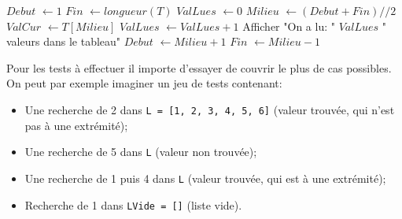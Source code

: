 \documentclass[12pt]{article}
\begin{document}
\begin{MaReponse}
\begin{alphenum}
			\begin{algorithmic}[1]
				\State $Debut$ $\leftarrow 1$
				\State $Fin$ $\leftarrow longueur(T)$
				\State $ValLues$ $\leftarrow 0$
				\State $Milieu$ $\leftarrow (Debut + Fin) // 2$
				\State $ValCur$ $\leftarrow T[Milieu]$
				\State $ValLues$ $\leftarrow ValLues + 1$
				\State Afficher "On a lu: " $ValLues$ " valeurs dans le tableau"
				\State{}
				\State $Debut$ $\leftarrow Milieu + 1$
				\Else
				\State $Fin$ $\leftarrow Milieu - 1$
				\EndIf
				\EndWhile
				\State{}
				\EndFunction
			\end{algorithmic}
			\item Pour les tests à effectuer il importe d'essayer de couvrir le plus de cas possibles. On peut par exemple imaginer un jeu de tests contenant:
			\begin{itemize}
				\item Une recherche de 2 dans \texttt{L = [1, 2, 3, 4, 5, 6]} (valeur trouvée, qui n'est pas à une extrémité);
				\item Une recherche de 5 dans \texttt{L} (valeur non trouvée);
				\item Une recherche de 1 puis 4 dans \texttt{L} (valeur trouvée, qui est à une extrémité);
				\item Recherche de 1 dans \texttt{LVide = []} (liste vide).
			\end{itemize}
		\end{alphenum}
	\end{MaReponse}
	
\end{document}
